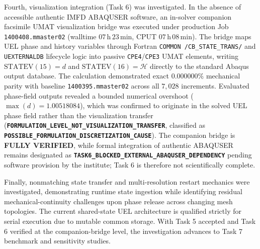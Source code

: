 Fourth, visualization integration (Task 6) was investigated. In the absence of accessible authentic IMFD ABAQUSER software, an in-solver companion facsimile UMAT visualization bridge was executed under production Job \texttt{1400408.mmaster02} (walltime $07\,\mathrm{h}\,23\,\mathrm{min}$, CPUT $07\,\mathrm{h}\,08\,\mathrm{min}$). The bridge maps UEL phase and history variables through Fortran \texttt{COMMON /CB\_STATE\_TRANS/} and \texttt{UEXTERNALDB} lifecycle logic into passive \texttt{CPE4}/\texttt{CPE3} UMAT elements, writing $\text{STATEV}(15) = d$ and $\text{STATEV}(16) = \mathcal{H}$ directly to the standard Abaqus output database. The calculation demonstrated exact $0.000000\%$ mechanical parity with baseline \texttt{1400395.mmaster02} across all $7{,}028$ increments. Evaluated phase-field outputs revealed a bounded numerical overshoot ($\max(d) = 1.00518084$), which was confirmed to originate in the solved UEL phase field rather than the visualization transfer (\textbf{\texttt{FORMULATION\_LEVEL\_NOT\_VISUALIZATION\_TRANSFER}}, classified as \textbf{\texttt{POSSIBLE\_FORMULATION\_DISCRETIZATION\_CAUSE}}). The companion bridge is \textbf{FULLY VERIFIED}, while formal integration of authentic ABAQUSER remains designated as \textbf{\texttt{TASK6\_BLOCKED\_EXTERNAL\_ABAQUSER\_DEPENDENCY}} pending software provision by the institute; Task 6 is therefore not scientifically complete.

Finally, nonmatching state transfer and multi-resolution restart mechanics were investigated, demonstrating runtime state ingestion while identifying residual mechanical-continuity challenges upon phase release across changing mesh topologies. The current shared-state UEL architecture is qualified strictly for serial execution due to mutable common storage. With Task 5 accepted and Task 6 verified at the companion-bridge level, the investigation advances to Task 7 benchmark and sensitivity studies.
